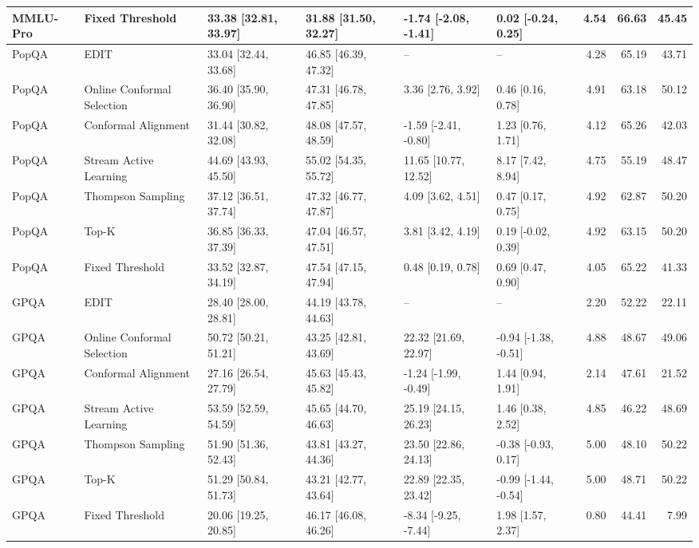 \begin{table}[t]
{\begin{tabular}{llllllrrr}
MMLU-Pro & Fixed Threshold & 33.38 [32.81, 33.97] & 31.88 [31.50, 32.27] & -1.74 [-2.08, -1.41] & 0.02 [-0.24, 0.25] & 4.54 & 66.63 & 45.45 \\
\midrule
PopQA & EDIT & 33.04 [32.44, 33.68] & 46.85 [46.39, 47.32] & -- & -- & 4.28 & 65.19 & 43.71 \\
PopQA & Online Conformal Selection & 36.40 [35.90, 36.90] & 47.31 [46.78, 47.85] & 3.36 [2.76, 3.92] & 0.46 [0.16, 0.78] & 4.91 & 63.18 & 50.12 \\
PopQA & Conformal Alignment & 31.44 [30.82, 32.08] & 48.08 [47.57, 48.59] & -1.59 [-2.41, -0.80] & 1.23 [0.76, 1.71] & 4.12 & 65.26 & 42.03 \\
PopQA & Stream Active Learning & 44.69 [43.93, 45.50] & 55.02 [54.35, 55.72] & 11.65 [10.77, 12.52] & 8.17 [7.42, 8.94] & 4.75 & 55.19 & 48.47 \\
PopQA & Thompson Sampling & 37.12 [36.51, 37.74] & 47.32 [46.77, 47.87] & 4.09 [3.62, 4.51] & 0.47 [0.17, 0.75] & 4.92 & 62.87 & 50.20 \\
PopQA & Top-K & 36.85 [36.33, 37.39] & 47.04 [46.57, 47.51] & 3.81 [3.42, 4.19] & 0.19 [-0.02, 0.39] & 4.92 & 63.15 & 50.20 \\
PopQA & Fixed Threshold & 33.52 [32.87, 34.19] & 47.54 [47.15, 47.94] & 0.48 [0.19, 0.78] & 0.69 [0.47, 0.90] & 4.05 & 65.22 & 41.33 \\
\midrule
GPQA & EDIT & 28.40 [28.00, 28.81] & 44.19 [43.78, 44.63] & -- & -- & 2.20 & 52.22 & 22.11 \\
GPQA & Online Conformal Selection & 50.72 [50.21, 51.21] & 43.25 [42.81, 43.69] & 22.32 [21.69, 22.97] & -0.94 [-1.38, -0.51] & 4.88 & 48.67 & 49.06 \\
GPQA & Conformal Alignment & 27.16 [26.54, 27.79] & 45.63 [45.43, 45.82] & -1.24 [-1.99, -0.49] & 1.44 [0.94, 1.91] & 2.14 & 47.61 & 21.52 \\
GPQA & Stream Active Learning & 53.59 [52.59, 54.59] & 45.65 [44.70, 46.63] & 25.19 [24.15, 26.23] & 1.46 [0.38, 2.52] & 4.85 & 46.22 & 48.69 \\
GPQA & Thompson Sampling & 51.90 [51.36, 52.43] & 43.81 [43.27, 44.36] & 23.50 [22.86, 24.13] & -0.38 [-0.93, 0.17] & 5.00 & 48.10 & 50.22 \\
GPQA & Top-K & 51.29 [50.84, 51.73] & 43.21 [42.77, 43.64] & 22.89 [22.35, 23.42] & -0.99 [-1.44, -0.54] & 5.00 & 48.71 & 50.22 \\
GPQA & Fixed Threshold & 20.06 [19.25, 20.85] & 46.17 [46.08, 46.26] & -8.34 [-9.25, -7.44] & 1.98 [1.57, 2.37] & 0.80 & 44.41 & 7.99 \\

\end{tabular}}
\end{table}
